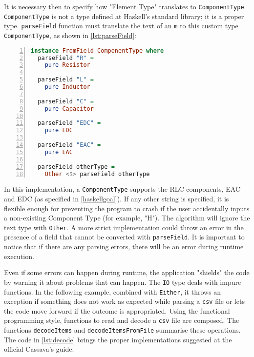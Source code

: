 It is necessary then to specify how "Element Type" translates to \lstinline!ComponentType!. \lstinline!ComponentType! is not a type defined at Haskell's standard library; it is a proper type. \lstinline!parseField! function must translate the text of an \lstinline!m! to this custom type \lstinline!ComponentType!, as shown in \cref{lst:parseField}:


\begin{lstlisting}[language=Haskell, numbers=left, caption={parseField}, captionpos=b, label={lst:parseField}]
instance FromField ComponentType where
  parseField "R" =
    pure Resistor

  parseField "L" =
    pure Inductor

  parseField "C" =
    pure Capacitor

  parseField "EDC" =
    pure EDC

  parseField "EAC" =
    pure EAC

  parseField otherType =
    Other <$> parseField otherType

\end{lstlisting}

In this implementation, a \lstinline!ComponentType! supports the RLC components, EAC and EDC (as specified in \cref{haskellgoal}). If any other string is specified, it is flexible enough for preventing the program to crash if the user accidentally inputs a non-existing Component Type (for example, "H"). The algorithm will ignore the text type with \lstinline!Other!. A more strict implementation could throw an error in the presence of a field that cannot be converted with \lstinline!parseField!. It is important to notice that if there are any parsing errors, there will be an error during runtime execution. 


Even if some errors can happen during runtime, the application "shields" the code by warning it about problems that can happen. The \lstinline!IO! type deals with impure functions. In the following example, combined with \lstinline!Either!, it throws an exception if something does not work as expected while parsing a \lstinline!csv! file or lets the code move forward if the outcome is appropriated. Using the functional programming style, functions to read and decode a \lstinline!csv! file are composed. The functions \lstinline!decodeItems! and \lstinline!decodeItemsFromFile! summarise these operations. The code in \cref{lst:decode} brings the proper implementations suggested at the official Cassava's guide:

